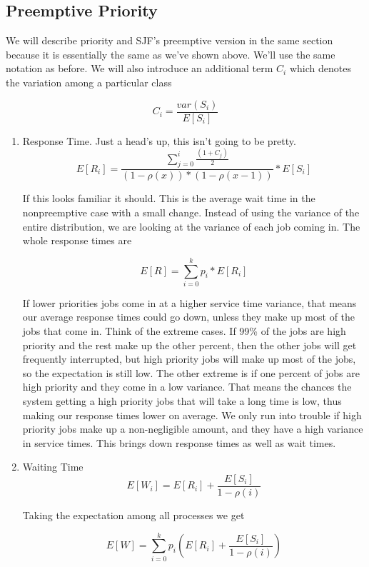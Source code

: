 \subsection{Preemptive Priority}

We will describe priority and SJF's preemptive version in the same section because it is essentially the same as we've shown above.
We'll use the same notation as before.
We will also introduce an additional term $C_i$ which denotes the variation among a particular class

\[
    C_i = \frac{var(S_i)}{E[S_i]}
\]

\begin{enumerate}
\item Response Time. Just a head's up, this isn't going to be pretty.
  \[
  E[R_i] = \frac{\sum\limits_{j=0}^i\frac{(1 + C_j)}{2}}{(1 - \rho(x))*( 1 - \rho(x-1))} * E[S_i]
  \]

  If this looks familiar it should.
  This is the average wait time in the nonpreemptive case with a small change. Instead of using the variance of the entire distribution, we are looking at the variance of each job coming in.
  The whole response times are

  \[
     E[R] = \sum\limits_{i = 0}^k p_i * E[R_i]
  \]

  If lower priorities jobs come in at a higher service time variance, that means our average response times could go down, unless they make up most of the jobs that come in.
  Think of the extreme cases.
  If 99\% of the jobs are high priority and the rest make up the other percent, then the other jobs will get frequently interrupted, but high priority jobs will make up most of the jobs, so the expectation is still low.
  The other extreme is if one percent of jobs are high priority and they come in a low variance.
  That means the chances the system getting a high priority jobs that will take a long time is low, thus making our response times lower on average.
  We only run into trouble if high priority jobs make up a non-negligible amount, and they have a high variance in service times.
  This brings down response times as well as wait times.

\item Waiting Time
  \[
  E[W_i] = E[R_i] + \frac{E[S_i]}{1 - \rho(i)}
  \]

  Taking the expectation among all processes we get

  \[
  E[W] = \sum\limits_{i = 0}^k p_i (E[R_i] + \frac{E[S_i]}{1 - \rho(i)})
  \]


\end{enumerate}
